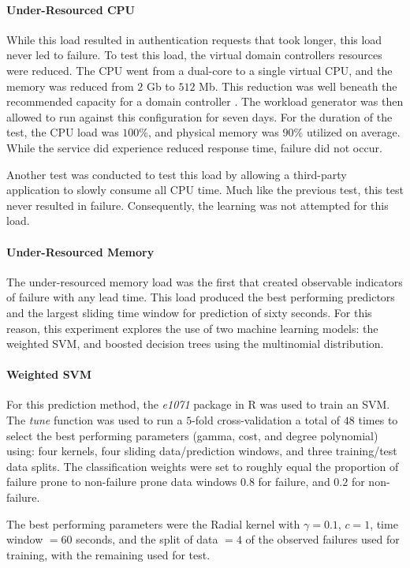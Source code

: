 \paragraph{Under-Resourced \ac{CPU}}
While this load resulted in authentication requests that took longer, this load
never led to failure.  To test this load, the virtual domain controllers
resources were reduced.  The \ac{CPU} went from a dual-core to a single virtual
CPU, and the memory was reduced from $2$ Gb to $512$ Mb.  This reduction was
well beneath the recommended capacity for a domain controller \citep{mak12}.
The workload generator was then allowed to run against this configuration for
seven days.  For the duration of the test, the \ac{CPU} load was $100\%$, and
physical memory was $90\%$ utilized on average.  While the service did
experience reduced response time, failure did not occur.

Another test was conducted to test this load by allowing a third-party
application to slowly consume all \ac{CPU} time.  Much like the previous test,
this test never resulted in failure.  Consequently, the learning was not
attempted for this load.

\paragraph{Under-Resourced Memory}
The under-resourced memory load was the first that created observable
indicators of failure with any lead time.  This load produced the best
performing predictors and the largest sliding time window for prediction of
sixty seconds.  For this reason, this experiment explores the use of two
machine learning models: the weighted \ac{SVM}, and boosted decision trees
using the multinomial distribution.  

\paragraph{Weighted \ac{SVM}}
For this prediction method, the \emph{e1071} package in R was used to train an
\ac{SVM}.  The \emph{tune} function was used to run a $5$-fold cross-validation
a total of $48$ times to select the best performing parameters (gamma, cost,
and degree polynomial) using: four kernels, four sliding data/prediction
windows, and three training/test data splits.  The classification weights were
set to roughly equal the proportion of failure prone to non-failure prone data
windows $0.8$ for failure, and $0.2$ for non-failure.

The best performing parameters were the Radial kernel with $\gamma = 0.1$, $c =
1$, time window $= 60$ seconds, and the split of data $= 4$ of the observed
failures used for training, with the remaining used for test.


